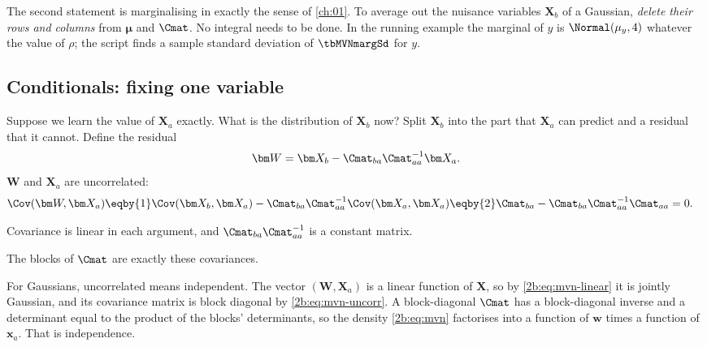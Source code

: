 The second statement is marginalising in exactly the sense of \cref{ch:01}. To average out the nuisance variables $\bm X_b$ of a Gaussian, \emph{delete their rows and columns} from $\bm\mu$ and $\Cmat$. No integral needs to be done. In the running example the marginal of $y$ is $\Normal(\mu_y,4)$ whatever the value of $\rho$; the script finds a sample standard deviation of $\tbMVNmargSd$ for $y$.

\subsection{Conditionals: fixing one variable}
\label{2b:sec:mvn-conditional}

Suppose we learn the value of $\bm X_a$ exactly. What is the distribution of $\bm X_b$ now? Split $\bm X_b$ into the part that $\bm X_a$ can predict and a residual that it cannot. Define the residual
\[
  \bm W=\bm X_b-\Cmat_{ba}\Cmat_{aa}^{-1}\bm X_a .
\]
$\bm W$ and $\bm X_a$ are uncorrelated:
\begin{align}
  \Cov(\bm W,\bm X_a)
  &\eqby{1} \Cov(\bm X_b,\bm X_a)-\Cmat_{ba}\Cmat_{aa}^{-1}\Cov(\bm X_a,\bm X_a)
   \eqby{2} \Cmat_{ba}-\Cmat_{ba}\Cmat_{aa}^{-1}\Cmat_{aa}=0 .
  \label{2b:eq:mvn-uncorr}
\end{align}
\begin{explain}
  \item Covariance is linear in each argument, and $\Cmat_{ba}\Cmat_{aa}^{-1}$ is a constant matrix.
  \item The blocks of $\Cmat$ are exactly these covariances.
\end{explain}
For Gaussians, uncorrelated means independent. The vector $(\bm W,\bm X_a)$ is a linear function of $\bm X$, so by \eqref{2b:eq:mvn-linear} it is jointly Gaussian, and its covariance matrix is block diagonal by \eqref{2b:eq:mvn-uncorr}. A block-diagonal $\Cmat$ has a block-diagonal inverse and a determinant equal to the product of the blocks' determinants, so the density \eqref{2b:eq:mvn} factorises into a function of $\bm w$ times a function of $\bm x_a$. That is independence.

